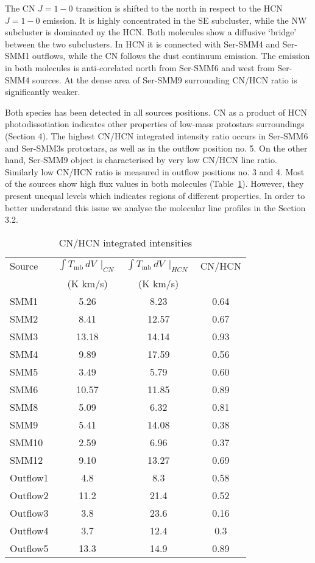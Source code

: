\documentclass{aa}
\begin{document}
The CN $J=1-0$ transition is shifted to the north in respect to the HCN $J=1-0$ emission. It is highly concentrated in the SE subcluster, while the NW subcluster is dominated ny the HCN. Both molecules show a diffusive ‘bridge’ between the two subclusters. In HCN it is connected with Ser-SMM4 and Ser-SMM1 outflows, while the CN follows the dust continuum emission.  The emission in both molecules is anti-corelated north from Ser-SMM6 and west from Ser-SMM4 sources. At the dense area of Ser-SMM9 surrounding CN/HCN ratio is significantly weaker. 

Both species has been detected in all sources positions. CN as a product of HCN photodissotiation indicates other properties of low-mass protostars surroundings (Section 4). The highest CN/HCN integrated intensity ratio occurs in Ser-SMM6 and Ser-SMM3s protostars, as well as in the outflow position no. 5. On the other hand, Ser-SMM9 object is characterised by very low CN/HCN line ratio. Similarly low CN/HCN ratio is measured in outflow positions no. 3 and 4. Most of the sources show high flux values in both molecules (Table~\ref{table:CN/HCN}). However, they present unequal levels which indicates regions of different properties. In order to better understand this issue we analyse the molecular line profiles in the Section 3.2.


\begin{table}
\caption{CN/HCN integrated intensities}             %
\label{table:CN/HCN}      %
\centering                          %
\begin{tabular}{l c c c} 
\hline\hline  
Source & $\int T_\mathrm{mb}\, dV \, \mid_{CN}$ &  $\int T_\mathrm{mb}\, dV \, \mid_{HCN}$ & CN/HCN \\
& (K km/s) & (K km/s) & \\
\hline
SMM1 & 5.26 & 8.23 & 0.64 \\
SMM2 & 8.41 & 12.57 & 0.67 \\
SMM3 & 13.18 & 14.14 & 0.93 \\ 
SMM4 & 9.89 & 17.59 & 0.56\\
SMM5 & 3.49 & 5.79 & 0.60 \\
SMM6 & 10.57 & 11.85 & 0.89 \\ 
SMM8 & 5.09 & 6.32 & 0.81 \\
SMM9 & 5.41 & 14.08 & 0.38 \\
SMM10 & 2.59 & 6.96 & 0.37\\ 
SMM12 & 9.10 & 13.27 & 0.69 \\ \hdashline
Outflow1 & 4.8 & 8.3 & 0.58 \\
Outflow2 & 11.2 & 21.4 & 0.52 \\
Outflow3 & 3.8 & 23.6 & 0.16 \\
Outflow4 & 3.7 & 12.4 & 0.3 \\
Outflow5 & 13.3 & 14.9 & 0.89 \\
\hline
\end{tabular}
\end{table} 
\end{document}
